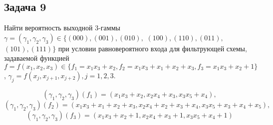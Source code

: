 \documentclass[utf8x, 14pt]{G7-32} %
\begin{document}
\subsection{Задача 9}
Найти вероятность выходной 3-гаммы $\gamma = (\gamma_1,\gamma_2,\gamma_3) \in \{ (000), (001), (010),$ $ (100), (110), (011),$ $(101), (111) \}$ при условии равновероятного входа для фильтрующей схемы, задаваемой функцией $f=f(x_1,x_2,x_3)\in \{f_1 = x_1 x_3+x_2, f_2 = x_1 x_3+x_1+x_2+x_3, f_3 = x_1 x_3+x_2+1\}$, $\gamma_j = f(x_j, x_{j+1}, x_{j+2}), j=1,2,3$.

$$ (\gamma_1,\gamma_2,\gamma_3) (f_1) = (x_1 x_3 + x_2, x_2 x_4 + x_3, x_3 x_5 + x_4),$$ 
$$ (\gamma_1,\gamma_2,\gamma_3) (f_2) = (x_1 x_3+x_1+x_2+x_3, x_2 x_4+x_2+x_3+x_4, x_3 x_5+x_3+x_4+x_5),$$
$$ (\gamma_1,\gamma_2,\gamma_3) (f_3) = (x_1 x_3+x_2+1, x_2 x_4+x_3+1, x_3 x_5+x_4+1) $$
\end{document}
